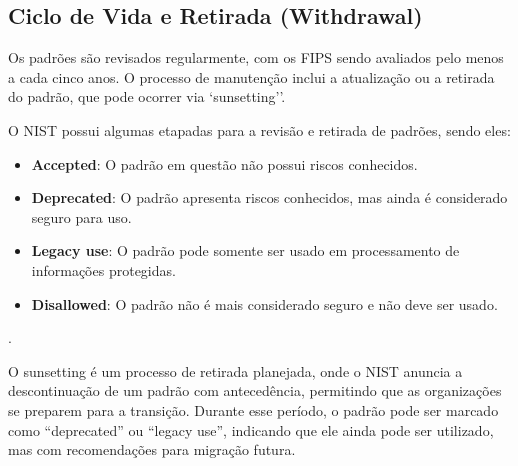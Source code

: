         \subsection{Ciclo de Vida e Retirada (Withdrawal)}
            Os padrões são revisados regularmente, com os FIPS sendo avaliados pelo menos a cada cinco anos\cite{nistIR7977}. O processo de manutenção inclui a atualização ou a retirada do padrão, que pode ocorrer via `sunsetting''\cite{nistIR7977}.

            O NIST possui algumas etapadas para a revisão e retirada de padrões, sendo eles:
            \begin{itemize}
                \item \textbf{Accepted}: O padrão em questão não possui riscos conhecidos.
                \item \textbf{Deprecated}: O padrão apresenta riscos conhecidos, mas ainda é considerado seguro para uso.
                \item \textbf{Legacy use}: O padrão pode somente ser usado em processamento de informações protegidas.
                \item \textbf{Disallowed}: O padrão não é mais considerado seguro e não deve ser usado.
            \end{itemize}\cite{nistSP800131}.

            O sunsetting é um processo de retirada planejada, onde o NIST anuncia a descontinuação de um padrão com antecedência, permitindo que as organizações se preparem para a transição\cite{nistSP800131}. Durante esse período, o padrão pode ser marcado como ``deprecated'' ou ``legacy use'', indicando que ele ainda pode ser utilizado, mas com recomendações para migração futura\cite{nistSP800131}.